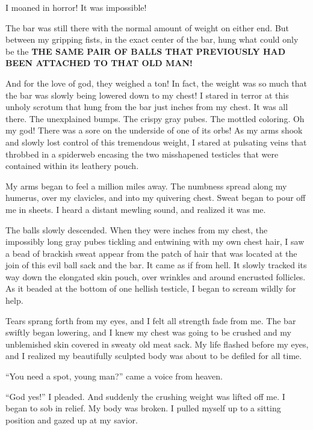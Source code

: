 I moaned in horror! It was impossible!



The bar was still there with the normal amount of weight on either
end. But between my gripping fists, in the exact center of the bar,
hung what could only be the {\bf THE SAME PAIR OF BALLS THAT
PREVIOUSLY HAD BEEN ATTACHED TO THAT OLD MAN!}



And for the love of god, they weighed a ton! In fact, the weight
was so much that the bar was slowly being lowered down to my chest!
I stared in terror at this unholy scrotum that hung from the bar
just inches from my chest. It was all there. The unexplained bumps.
The crispy gray pubes. The mottled coloring. Oh my god! There was a
sore on the underside of one of its orbs! As my arms shook and
slowly lost control of this tremendous weight, I stared at
pulsating veins that throbbed in a spiderweb encasing the two
misshapened testicles that were contained within its leathery
pouch.



My arms began to feel a million miles away. The numbness spread
along my humerus, over my clavicles, and into my quivering chest.
Sweat began to pour off me in sheets. I heard a distant mewling
sound, and realized it was me.



The balls slowly descended. When they were inches from my chest,
the impossibly long gray pubes tickling and entwining with my own
chest hair, I saw a bead of brackish sweat appear from the patch of
hair that was located at the join of this evil ball sack and the
bar. It came as if from hell. It slowly tracked its way down the
elongated skin pouch, over wrinkles and around encrusted follicles.
As it beaded at the bottom of one hellish testicle, I began to
scream wildly for help.



Tears sprang forth from my eyes, and I felt all strength fade from
me. The bar swiftly began lowering, and I knew my chest was going
to be crushed and my unblemished skin covered in sweaty old meat
sack. My life flashed before my eyes, and I realized my beautifully
sculpted body was about to be defiled for all time.



``You need a spot, young man?'' came a voice from heaven.



``God yes!'' I pleaded. And suddenly the crushing weight was lifted
off me. I began to sob in relief. My body was broken. I pulled
myself up to a sitting position and gazed up at my savior.



